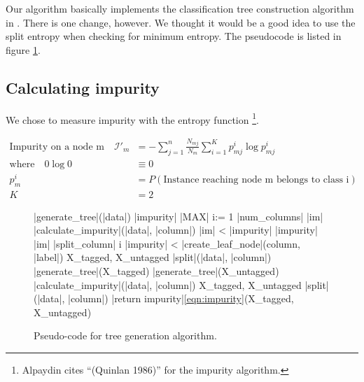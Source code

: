 \documentclass[a4paper,10pt]{article}
\begin{document}
Our algorithm basically implements the classification tree construction
algorithm in \cite[p. 179]{alpaydin2004}.  There is one change, however.
We thought it would be a good idea to use the split entropy when
checking for minimum entropy.  The pseudocode is listed in figure
\ref{fig:tree-gen}.

\subsection{Calculating impurity}

We chose to measure impurity with the entropy function
\cite[p. 176]{alpaydin2004}\footnote{Alpaydin cites ``(Quinlan 1986)''
  for the impurity algorithm.}.

\begin{equation}
\begin{split}
\text{Impurity on a node m} \quad
\mathcal{I}'_m &= - \sum_{j=1}^n\frac{N_{mj}}{N_m}\sum_{i=1}^K p_{mj}^i 
    \log p_{mj}^i  \label{eqn:impurity} \\
\text{where} \quad 0 \log 0 &\equiv 0  \\
p_m^i &= P(\text{Instance reaching node m belongs to class i})  \\
K &= 2
\end{split}
\end{equation}


\begin{figure}[th]
  \centering
  \begin{minipage}[c]{1.0\textwidth}
\begin{program}
  \PROC |generate_tree|(|data|) \BODY
  |impurity| \leftarrow |MAX|
  \FOR i:= 1 \TO |num_columns| \DO
       |im| \leftarrow |calculate_impurity|(|data|, |column|)
       \IF |im| < |impurity| 
       \THEN
          |impurity| \leftarrow |im|
          |split_column| \leftarrow i
       \FI
       \OD
  \IF |impurity| < \theta 
  \THEN
       |create_leaf_node|(column, |label|)
       \EXIT 
       \FI
  X_{tagged}, X_{untagged} \leftarrow |split|(|data|, |column|)
  |generate_tree|(X_{tagged})
  |generate_tree|(X_{untagged})
  \ENDPROC
  \PROC |calculate_impurity|(|data|, |column|) \BODY
  X_{tagged}, X_{untagged} \leftarrow |split|(|data|, |column|)
  |return impurity|\ref{eqn:impurity}(X_{tagged}, X_{untagged}) 
  \ENDPROC
\end{program}
  \end{minipage}
  \caption{Pseudo-code for tree generation algorithm.}
  \label{fig:tree-gen}
\end{figure}
\end{document}

